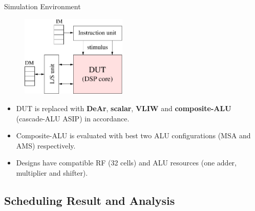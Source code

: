 \documentclass{beamer}
\begin{document}
\begin{CJK}{UTF8}{bkai}
            \begin{frame}{Simulation Environment}
                \begin{figure}[!ht] 
                    \centering
                    \includegraphics[width=0.45\textwidth]{./figs/sim.eps}
                \end{figure}
                \begin{itemize}
                    \item <2->{DUT is replaced with \textbf{DeAr}, \textbf{scalar}, \textbf{VLIW} and \textbf{composite-ALU} (cascade-ALU ASIP) in accordance.}
                    \item <3->{Composite-ALU is evaluated with best two ALU configurations (MSA and AMS) respectively.}
                    \item <4->{Designs have compatible RF (32 cells) and ALU resources (one adder, multiplier and shifter).}
                \end{itemize}
            \end{frame}

            \subsection{Scheduling Result and Analysis}


\end{CJK}
\end{document}
